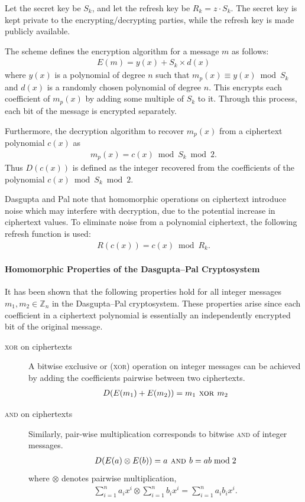 Let the secret key be $S_k$, and let the refresh key be $R_k = z \cdot S_k$. The secret key is kept private to the encrypting/decrypting parties, while the refresh key is made publicly available.

The scheme defines the encryption algorithm for a message $m$ as follows:
\begin{align*}
	E(m) = y(x) + S_k\times d(x)
\end{align*}
where
$y(x)$ is a polynomial of degree $n$ such that $m_p(x) \equiv y(x) \bmod S_k$ and $d(x)$ is a randomly chosen polynomial of degree $n$. This encrypts each coefficient of $m_p(x)$ by adding some multiple of $S_k$ to it. Through this process, each bit of the message is encrypted separately.

Furthermore, the decryption algorithm to recover $m_p(x)$ from a ciphertext polynomial $c(x)$ as
\begin{align*}
	m_p(x) = c(x) \bmod S_k \bmod 2.
\end{align*}
Thus $D(c(x))$ is defined as the integer recovered from the coefficients of the polynomial $c(x) \bmod S_k \bmod 2$.

Dasgupta and Pal note that homomorphic operations on ciphertext introduce noise which may interfere with decryption, due to the potential increase in ciphertext values.
To eliminate noise from a polynomial ciphertext, the following refresh function is used:
\begin{align*}
	R(c(x)) = c(x) \bmod R_k.
\end{align*}

\paragraph{Homomorphic Properties of the Dasgupta--Pal Cryptosystem}
It has been shown \cite{dasgupta_design_2016} that the following properties hold for all integer messages $m_1, m_2 \in \mathbb{Z}_n$ in the Dasgupta--Pal cryptosystem. These properties arise since each coefficient in a ciphertext polynomial is essentially an independently encrypted bit of the original message.
\begin{description}
	\item[\textsc{xor} on ciphertexts]
	A bitwise exclusive or (\textsc{xor}) operation on integer messages can be achieved by adding the coefficients pairwise between two ciphertexts.
	\begin{align*}
		D(E(m_1)+E(m_2)) = m_1 \textsc{ xor } m_2
	\end{align*}
	\item[\textsc{and} on ciphertexts]
	Similarly, pair-wise multiplication corresponds to bitwise \textsc{and} of integer messages.
	\begin{align*}
		D(E(a) \otimes E(b)) = a \textsc{ and } b = ab \bmod 2
	\end{align*}
	where $\otimes$ denotes pairwise multiplication,
	\begin{align*}
		\sum_{i=1}^n{a_ix^i} \otimes \sum_{i=1}^n{b_ix^i} = \sum_{i=1}^n{a_ib_ix^i}.
	\end{align*}
\end{description}

